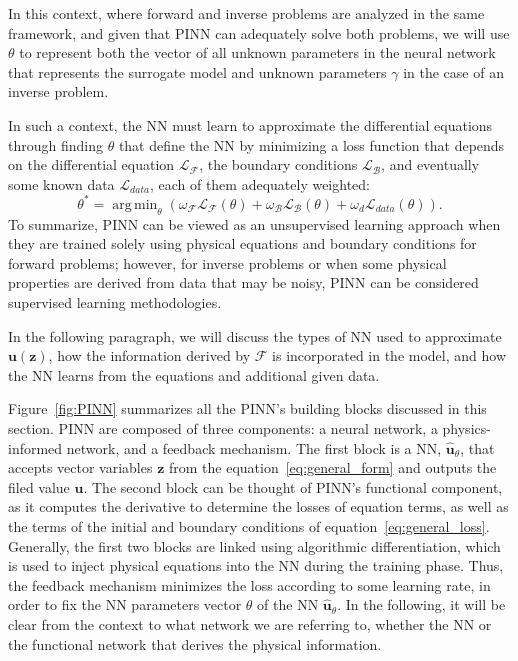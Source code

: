 \documentclass[pdflatex,sn-basic]{sn-jnl}%
\theoremstyle{thmstyleone}%
\theoremstyle{thmstyletwo}%
\theoremstyle{thmstylethree}%
\DeclareMathOperator*{\argmin}{arg\,min} %
\begin{document}
In this context, where forward and inverse problems are analyzed in the same framework, and given that PINN can adequately solve both problems, we will use $\theta$ to represent both the vector of all unknown parameters in the neural network that represents the surrogate model and unknown parameters $\gamma$ in the case of an inverse problem. 



In such a context, the NN must learn to approximate the differential equations through finding $\theta$ that define the NN by minimizing a loss function that depends on the differential equation $\mathcal{L}_\mathcal{F}$, the boundary conditions $ \mathcal{L}_\mathcal{B}$, and eventually some known data
$\mathcal{L}_{data}$, each of them adequately weighted:
\begin{equation}\label{eq:general_loss}
\theta^* =  \mathop{\argmin}_{\theta} \left(
\omega_\mathcal{F} \mathcal{L}_\mathcal{F}(\theta) +
\omega_\mathcal{B} \mathcal{L}_\mathcal{B}(\theta) +
\omega_{d} \mathcal{L}_{data} (\theta) 
\right).
\end{equation}
To summarize, PINN can be viewed as an unsupervised learning approach when they are trained solely using physical equations and boundary conditions for forward problems; however, for inverse problems or when some physical properties are derived from data that may be noisy, PINN can be considered supervised learning methodologies.


In the following paragraph, we will discuss the types of NN used to approximate  $\bm{u}(\bm{z})$, how the information derived by $\mathcal{F}$ is incorporated in the model, and how the NN learns from the equations and additional given data.


Figure~\ref{fig:PINN} summarizes all the PINN's building blocks discussed in this section.
PINN are composed of three components: a neural network, a physics-informed network, and a feedback mechanism.
The first block is a NN, $\hat{\bm{u}}_\theta$,  that accepts vector variables $\bm{z}$  from the equation~\eqref{eq:general_form} and outputs the filed value $\bm{u}$.
%
The second block can be thought of PINN's functional component, as it computes the derivative to determine the losses of equation terms, as well as the terms of the initial and boundary conditions of equation~\eqref{eq:general_loss}.
Generally, the first two blocks are linked using algorithmic differentiation, which is used to inject physical equations into the NN during the training phase.
Thus, the feedback mechanism minimizes the loss according to some learning rate, in order to fix the NN parameters vector $\theta$ of the NN $\hat{\bm{u}}_\theta$. 
In the following, it will be clear from the context to what network we are referring to, whether the NN or the functional network that derives the physical information.
\end{document}
